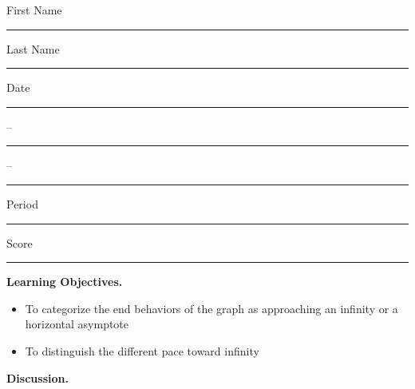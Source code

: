 \documentclass[twoside, 10pt]{article}
\title{}
\date{}
\begin{document}
\noindent
{\large
First Name \rule{6em}{.1pt}Last Name \rule{6em}{.1pt} Date \rule{1.5em}{.1pt} -- \rule{1.5em}{.1pt} -- \rule{1.5em}{.1pt} Period \rule{2em}{.1pt} Score \rule{2em}{.1pt}
}
\vspace{1em}

{\noindent \bf Learning Objectives.}
\begin{itemize}
\item
To categorize the end behaviors of the graph as approaching an infinity or a horizontal asymptote
\item
To distinguish the different pace toward infinity
\end{itemize}

{\noindent\bf Discussion.}
\end{document}
